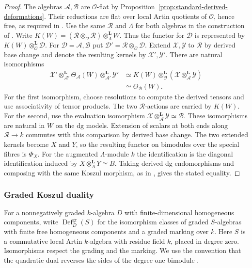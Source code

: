 \documentclass[12pt,a4paper,english,reqno]{amsart}
\numberwithin{equation}{section}
\theoremstyle{plain}
\theoremstyle{definition}
\begin{document}
\begin{proof}
The algebras $\mathcal A,\mathcal B$ are $\mathcal O$-flat by
Proposition~\ref{prop:standard-derived-deformations}.
Their reductions are flat over local Artin quotients of
$\mathcal O$, hence free, as required in
\cite[Section~1.2]{BezrukavnikovGinzburg2007}.
Use the same $\mathcal R$ and $\Lambda$ for both algebras in
the construction of \cite[(3.1.4)--(3.1.6)]{BezrukavnikovGinzburg2007}.
Write $K(W)=(\mathcal R\otimes_{\mathcal O}\mathcal R)
\otimes_\Lambda^{\mathbf L}W$. Thus the functor for
$\mathcal D$ is represented by
$K(W)\otimes_{\mathcal O}^{\mathbf L}\mathcal D$.
For $\mathcal D=\mathcal A,\mathcal B$ put
$\mathcal D'=\mathcal R\otimes_{\mathcal O}\mathcal D$.
Extend $\mathcal X,\mathcal Y$ to $\mathcal R$ by derived
base change and denote the resulting kernels by
$\mathcal X',\mathcal Y'$. There are natural isomorphisms
\[
\begin{split}
 \mathcal X'\otimes_{\mathcal A'}^{\mathbf L}
       \Theta_{\mathcal A}(W)
       \otimes_{\mathcal A'}^{\mathbf L}\mathcal Y'
 &\simeq K(W)\otimes_{\mathcal O}^{\mathbf L}
       (\mathcal X\otimes_{\mathcal A}^{\mathbf L}\mathcal Y)\\
 &\simeq \Theta_{\mathcal B}(W).
\end{split}
\]
For the first isomorphism, choose resolutions to compute the
derived tensors and use associativity of tensor products. The
two $\mathcal R$-actions are carried by $K(W)$. For the second,
use the evaluation isomorphism
$\mathcal X\otimes_{\mathcal A}^{\mathbf L}\mathcal Y\simeq\mathcal B$.
These isomorphisms are natural in $W$ on the dg models.
Extension of scalars at both ends along $\mathcal R\to k$
commutes with this comparison by derived base change. The two
extended kernels become $X$ and $Y$, so the resulting functor
on bimodules over the special fibres is $\Phi_X$. For the
augmented $\Lambda$-module $k$ the identification is the
diagonal identification induced by $X\otimes_A^{\mathbf L}Y\simeq B$.
Taking derived dg endomorphisms and composing with the same
Koszul morphism, as in
\cite[(3.2.1)]{BezrukavnikovGinzburg2007}, gives the stated equality.
\end{proof}

\subsubsection*{Graded Koszul duality}

For a nonnegatively graded $k$-algebra $D$ with finite-dimensional
homogeneous components, write $\operatorname{Def}^{\mathrm{gr}}_D(S)$
for the isomorphism classes of graded $S$-algebras with finite free
homogeneous components and a graded marking over $k$. Here $S$ is
a commutative local Artin $k$-algebra with residue field $k$, placed
in degree zero. Isomorphisms respect the grading and the marking.
We use the convention that the quadratic dual reverses the sides
of the degree-one bimodule \cite{PolishchukPositselski2005}.
\end{document}
